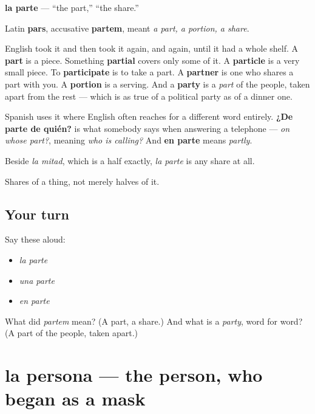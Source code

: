 \begin{cousinweb}
\textbf{la parte} — \textquotedblleft{}the part,\textquotedblright{} \textquotedblleft{}the share.\textquotedblright{}

Latin \textbf{pars}, accusative \textbf{partem}, meant \emph{a part, a portion, a share}.

English took it and then took it again, and again, until it had a whole shelf. A \textbf{part} is a piece. Something \textbf{partial} covers only some of it. A \textbf{particle} is a very small piece. To \textbf{participate} is to take a part. A \textbf{partner} is one who shares a part with you. A \textbf{portion} is a serving. And a \textbf{party} is a \emph{part} of the people, taken apart from the rest — which is as true of a political party as of a dinner one.

Spanish uses it where English often reaches for a different word entirely. \textbf{¿De parte de quién?} is what somebody says when answering a telephone — \emph{on whose part?}, meaning \emph{who is calling?} And \textbf{en parte} means \emph{partly}.

Beside \emph{la mitad}, which is a half exactly, \emph{la parte} is any share at all.
\end{cousinweb}

\begin{grammarlens}[title={What you've built}]
Shares of a thing, not merely halves of it.
\end{grammarlens}

\subsection*{Your turn}
Say these aloud:

\begin{itemize}
\raggedright
  \item \emph{la parte}
  \item \emph{una parte}
  \item \emph{en parte}
\end{itemize}

\begin{tcolorbox}[breakable,colback=teal!4,colframe=teal!35!black,title={Before you move on}]
What did \emph{partem} mean? (A part, a share.) And what is a \emph{party}, word for word? (A part of the people, taken apart.)
\end{tcolorbox}
\section[la persona]{la persona — the person, who began as a mask}

